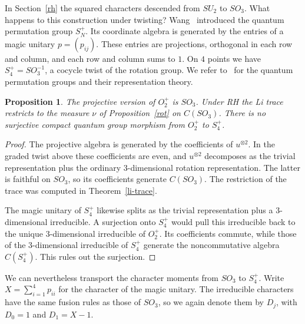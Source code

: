 \documentclass[11pt,a4paper]{article}
\newtheorem{prop}[thm]{Proposition}
\begin{document}
In Section~\ref{rh} the squared characters descended from $SU_2$ to $SO_3$. What happens to this construction under twisting? Wang~\cite{wang-finite} introduced the quantum permutation group $S_N^+$. Its coordinate algebra is generated by the entries of a magic unitary $p=(p_{ij})$. These entries are projections, orthogonal in each row and column, and each row and column sums to $1$. On $4$ points we have $S_4^+=SO_3^{-1}$, a cocycle twist of the rotation group. We refer to~\cite{banica-book} for the quantum permutation groups and their representation theory.

\begin{samepage}
\begin{prop}
The projective version of $O_2^+$ is $SO_3$. Under RH the Li trace restricts to the measure $\nu$ of Proposition~\textup{\ref{rot}} on $C(SO_3)$. There is no surjective compact quantum group morphism from $O_2^+$ to $S_4^+$.
\end{prop}
\end{samepage}
\begin{proof}
The projective algebra is generated by the coefficients of $u^{\otimes2}$. In the graded twist above these coefficients are even, and $u^{\otimes2}$ decomposes as the trivial representation plus the ordinary $3$-dimensional rotation representation. The latter is faithful on $SO_3$, so its coefficients generate $C(SO_3)$. The restriction of the trace was computed in Theorem~\ref{li-trace}.

The magic unitary of $S_4^+$ likewise splits as the trivial representation plus a $3$-dimensional irreducible. A surjection onto $S_4^+$ would pull this irreducible back to the unique $3$-dimensional irreducible of $O_2^+$. Its coefficients commute, while those of the $3$-dimensional irreducible of $S_4^+$ generate the noncommutative algebra $C(S_4^+)$. This rules out the surjection.
\end{proof}

We can nevertheless transport the character moments from $SO_3$ to $S_4^+$. Write $X=\sum_{i=1}^4p_{ii}$ for the character of the magic unitary. The irreducible characters have the same fusion rules as those of $SO_3$, so we again denote them by $D_j$, with $D_0=1$ and $D_1=X-1$.
\end{document}
